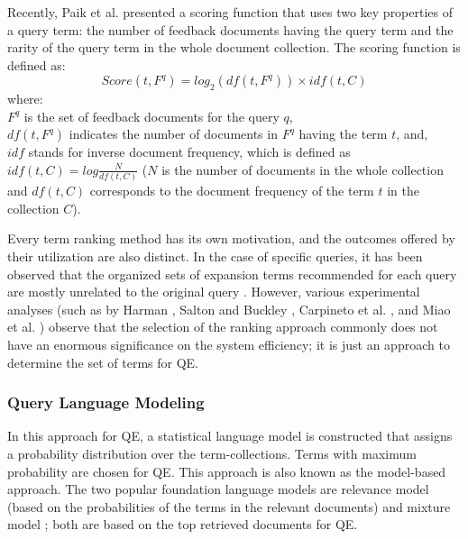 Recently, Paik et al. \cite{paik2014incremental} presented a scoring function that uses two key properties of a query term:  the number of feedback documents having the query term and the rarity of the query term in the whole document collection. The scoring function is defined as:
\begin{equation}
Score(t,F^q)=log_2(df(t,F^q))\times idf(t,C)
\end{equation}
where:\\
$F^q$ is the set of feedback documents for the query $q$,\\
$df(t,F^q)$ indicates the number of documents in $F^q$ having the term $t$, and,\\
$idf$ stands for inverse document frequency, which is defined as $idf(t,C)=log\frac{N}{df(t,C)}$ ($N$ is the number of documents in the whole collection and $df(t,C)$ corresponds to the document frequency of the term $t$ in the collection $C$).

Every term ranking method has its own motivation, and the outcomes offered by their utilization are also distinct. In the case of  specific queries, it has been observed that the organized sets of expansion terms recommended for each query are mostly unrelated to the original query \cite{carpineto2002improving}. However, various experimental analyses (such as by Harman \cite{harman1992relevance}, Salton and Buckley \cite{salton1997improving}, Carpineto et al. \cite{carpineto2001information}, and Miao et al. \cite{miao2012proximity}) observe that the selection of the ranking approach commonly does not have an enormous significance on the system efficiency; it is just an approach to determine the set of terms for QE. 


\subsubsection{Query Language Modeling}\label{ss:QLM}
In this approach for QE, a statistical language model is constructed that assigns a probability distribution over the term-collections. Terms with maximum probability are chosen  for QE. This approach is also known as the model-based approach. The two popular foundation language models are relevance model (based on the probabilities of the terms in the relevant documents) \cite{lavrenko2001relevance,croft2013language} and mixture model \cite{zhai2001model}; both are based on the top retrieved documents for QE. 

